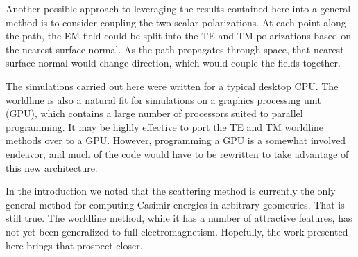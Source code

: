 Another possible approach to leveraging the results contained here into a general method is to consider coupling the two 
scalar polarizations.  
At each point along the path, the EM field could be split into the TE and TM polarizations based 
on the nearest surface normal.
As the path propagates through space, that nearest surface normal would change direction, which would couple the fields 
together.  

The simulations carried out here were written for a typical desktop CPU.
The worldline is also a natural fit for simulations on a graphics processing unit (GPU), 
which contains a large number of processors suited to parallel programming. 
It may be highly effective to port the TE and TM worldline methods over to a GPU.
However, programming a GPU is a somewhat involved endeavor, and much of the code would have to be 
rewritten to take advantage of this new architecture.  

In the introduction we noted that the scattering method is currently the only general
method for computing Casimir energies in arbitrary geometries.  That is still true.  The worldline method,
while it has a number of attractive features, has not yet been generalized to full electromagnetism.   
Hopefully, the work presented here brings that prospect closer.  

    
    
